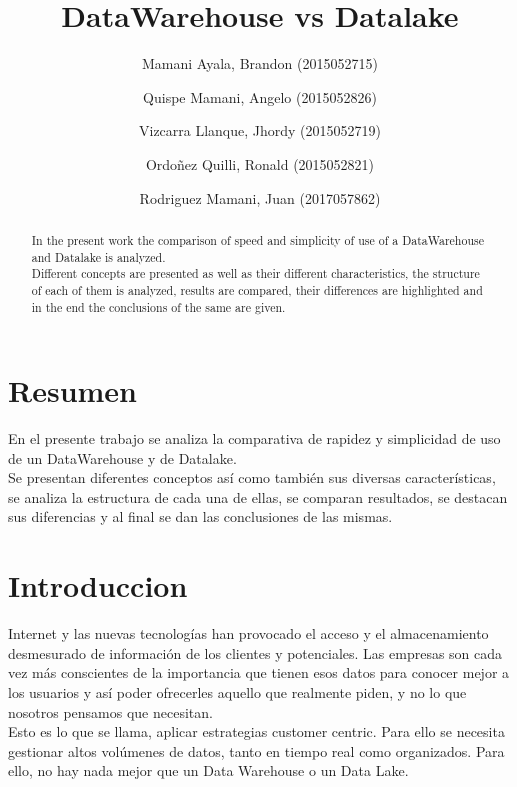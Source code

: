 \documentclass[preprint,12pt]{elsarticle}
\begin{document}
	
	\begin{frontmatter}
		
		
		\title{\huge DataWarehouse vs  Datalake}
		
		\author{Mamani Ayala, Brandon        (2015052715)}
		\author{Quispe Mamani, Angelo	      (2015052826)}
		\author{Vizcarra Llanque, Jhordy	      (2015052719)}
		\author{Ordoñez Quilli, Ronald          (2015052821)}
		\author{Rodriguez Mamani, Juan      (2017057862)}
		
		\address{Tacna, Perú}
		
		\begin{abstract}
			
In the present work the comparison of speed and simplicity of use of a DataWarehouse and Datalake is analyzed. \\
Different concepts are presented as well as their different characteristics, the structure of each of them is analyzed, results are compared, their differences are highlighted and in the end the conclusions of the same are given.
		\end{abstract}
\end{frontmatter}

	
	
	\section{Resumen}
En el presente trabajo se analiza la comparativa de rapidez y simplicidad de uso de un DataWarehouse y de Datalake.\\
Se presentan diferentes conceptos así como también sus diversas características, se analiza la estructura de cada una de ellas, se comparan resultados, se destacan sus diferencias y al final se dan las conclusiones de las mismas.\\
	
	



	
	
\section{Introduccion}

Internet y las nuevas tecnologías han provocado el acceso y el almacenamiento desmesurado de información de los clientes y potenciales. Las empresas son cada vez más conscientes de la importancia que tienen esos datos para conocer mejor a los usuarios y así poder ofrecerles aquello que realmente piden, y no lo que nosotros pensamos que necesitan.\\
Esto es lo que se llama, aplicar estrategias customer centric. Para ello se necesita gestionar altos volúmenes de datos, tanto en tiempo real como organizados. Para ello, no hay nada mejor que un Data Warehouse o un Data Lake.
\pagebreak
\end{document}
